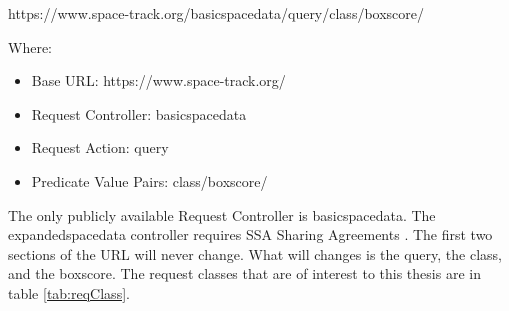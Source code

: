 \documentclass[12pt]{article}
\begin{document}
	https://www.space-track.org/basicspacedata/query/class/boxscore/ 
	
	Where: 

	\begin{itemize}	\singlespacing
		\item Base URL: https://www.space-track.org/
		
		\item Request Controller: basicspacedata
		\item Request Action: query
		\item Predicate Value Pairs: class/boxscore/
	\end{itemize}
\doublespacing
The only publicly available Request Controller is basicspacedata. The expandedspacedata controller requires SSA Sharing Agreements \cite{SpaceTrackAPI}. The first two sections of the URL will never change. What will changes is the query, the class, and the boxscore. The request classes that are of interest to this thesis are in table \ref{tab:reqClass}.\par
\end{document}
